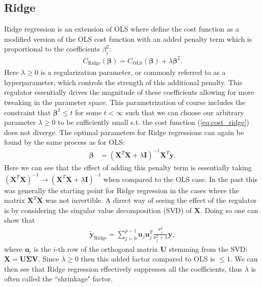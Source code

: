 \documentclass[%
reprint,
amsmath,amssymb,
aps,
pra,
]{revtex4-2}
\begin{document}
\subsection{Ridge}	\label{sec:THEORY_Ridge}
Ridge regression is an extension of OLS where define the cost function as a modified version of the OLS cost function with an added penalty term which is proportional to the coefficients $\beta_i^2$:
\begin{align}
	C_\text{Ridge}(\bm\beta)=C_\text{OLS}(\bm\beta)+\lambda\bm\beta^2.
	\label{eq:cost_ridge}
\end{align}
Here $\lambda\geq0$ is a regularization parameter, or commonly referred to as a hyperparameter, which controls the strength of this additional penalty. This regulator essentially drives the magnitude of these coefficients allowing for more tweaking in the parameter space. This parametrization of course includes the constraint that $\bm{\beta}^2\leq t$ for some $t<\infty$ such that we can choose our arbitrary parameter $\lambda\geq0$ to be sufficiently small s.t. the cost function (\ref{eq:cost_ridge}) does not diverge. The optimal parameters for Ridge regressions can again be found by the same process as for OLS:
\begin{align}
	\bm{\beta}&=(\bm{X}^T\bm{X}+\lambda\bm{I})^{-1}\bm{X}^T\bm{y}.
	\label{eq:beta_ridge}
\end{align}
Here we can see that the effect of adding this penalty term is essentially taking $(\bm X^T\bm X)^{-1}\to(\bm X^T\bm X+\lambda\bm I)^{-1}$ when compared to the OLS case. In the past this was generally the starting point for Ridge regression in the cases where the matrix $\bm X^T\bm X$ was not invertible. A direct way of seeing the effect of the regulator is by considering the singular value decomposition (SVD) of $\bm X$. Doing so one can show that 
\begin{align}
	\tilde{\bm{y}}_\text{Ridge}=\sum_{j=0}^{p-1}\bm{u}_j\bm{u}_j^T\frac{\sigma_j^2}{\sigma_j^2+\lambda}\bm{y},
	\label{eq:svd_ridge}
\end{align}
where $\bm u_i$ is the $i$-th row of the orthogonal matrix $\bm U$ stemming from the SVD: $\bm X=\bm U\bm \Sigma\bm V$. Since $\lambda\geq0$ then this added factor compared to OLS is $\leq1$. We can then see that Ridge regression effectively suppresses all the coefficients, thus $\lambda$ is often called the ``shrinkage" factor. 
\end{document}
